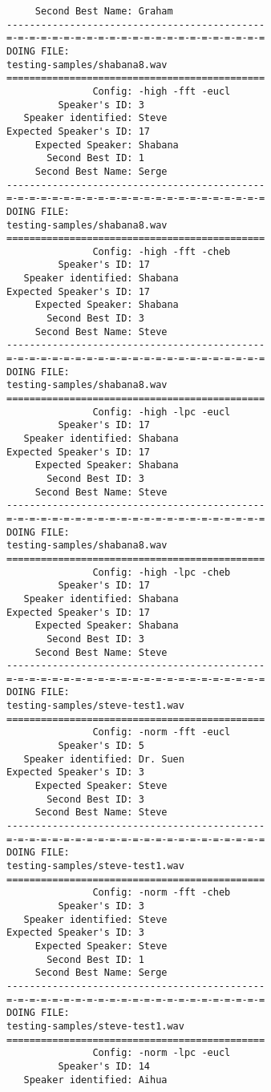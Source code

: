 \begin{verbatim}
     Second Best Name: Graham
---------------------------------------------
=-=-=-=-=-=-=-=-=-=-=-=-=-=-=-=-=-=-=-=-=-=-=
DOING FILE:
testing-samples/shabana8.wav
=============================================
               Config: -high -fft -eucl
         Speaker's ID: 3
   Speaker identified: Steve
Expected Speaker's ID: 17
     Expected Speaker: Shabana
       Second Best ID: 1
     Second Best Name: Serge
---------------------------------------------
=-=-=-=-=-=-=-=-=-=-=-=-=-=-=-=-=-=-=-=-=-=-=
DOING FILE:
testing-samples/shabana8.wav
=============================================
               Config: -high -fft -cheb
         Speaker's ID: 17
   Speaker identified: Shabana
Expected Speaker's ID: 17
     Expected Speaker: Shabana
       Second Best ID: 3
     Second Best Name: Steve
---------------------------------------------
=-=-=-=-=-=-=-=-=-=-=-=-=-=-=-=-=-=-=-=-=-=-=
DOING FILE:
testing-samples/shabana8.wav
=============================================
               Config: -high -lpc -eucl
         Speaker's ID: 17
   Speaker identified: Shabana
Expected Speaker's ID: 17
     Expected Speaker: Shabana
       Second Best ID: 3
     Second Best Name: Steve
---------------------------------------------
=-=-=-=-=-=-=-=-=-=-=-=-=-=-=-=-=-=-=-=-=-=-=
DOING FILE:
testing-samples/shabana8.wav
=============================================
               Config: -high -lpc -cheb
         Speaker's ID: 17
   Speaker identified: Shabana
Expected Speaker's ID: 17
     Expected Speaker: Shabana
       Second Best ID: 3
     Second Best Name: Steve
---------------------------------------------
=-=-=-=-=-=-=-=-=-=-=-=-=-=-=-=-=-=-=-=-=-=-=
DOING FILE:
testing-samples/steve-test1.wav
=============================================
               Config: -norm -fft -eucl
         Speaker's ID: 5
   Speaker identified: Dr. Suen
Expected Speaker's ID: 3
     Expected Speaker: Steve
       Second Best ID: 3
     Second Best Name: Steve
---------------------------------------------
=-=-=-=-=-=-=-=-=-=-=-=-=-=-=-=-=-=-=-=-=-=-=
DOING FILE:
testing-samples/steve-test1.wav
=============================================
               Config: -norm -fft -cheb
         Speaker's ID: 3
   Speaker identified: Steve
Expected Speaker's ID: 3
     Expected Speaker: Steve
       Second Best ID: 1
     Second Best Name: Serge
---------------------------------------------
=-=-=-=-=-=-=-=-=-=-=-=-=-=-=-=-=-=-=-=-=-=-=
DOING FILE:
testing-samples/steve-test1.wav
=============================================
               Config: -norm -lpc -eucl
         Speaker's ID: 14
   Speaker identified: Aihua

\end{verbatim}
